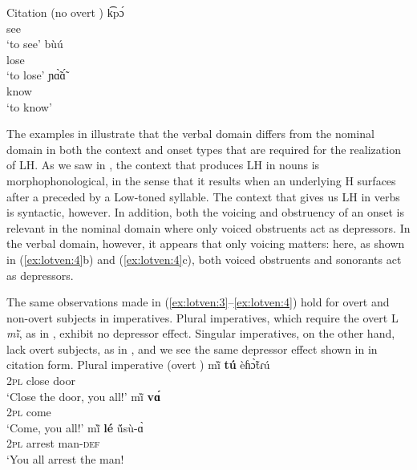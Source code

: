 \documentclass[output=paper,newtxmath,modfonts,nonflat]{langsci/langscibook}
\begin{document}
\ea\label{ex:lotven:4} Citation (no overt )
\ea\label{ex:lotven:4a}
    \gll k͡pɔ́\\
    see    \\
    \glt ‘to see’
\ex\label{ex:lotven:4b}
	\gll bùú\\
    lose\\
    \glt ‘to lose’
\ex\label{ex:lotven:4c}
	\gll ɲɑ̃̀ɑ̃́\\
    know\\
    \glt ‘to know’
\z
\z
                           
The examples in  illustrate that the verbal domain differs from the nominal domain in both the context and onset types that are required for the realization of LH. As we saw in , the context that produces LH  in nouns is morphophonological, in the sense that it results when an underlying H surfaces after a  preceded by a Low-toned syllable. The context that gives us LH in verbs is syntactic, however. In addition, both the voicing and obstruency of an onset is relevant in the nominal domain where only voiced obstruents act as depressors. In the verbal domain, however, it appears that only voicing matters: here, as shown in (\ref{ex:lotven:4}b) and (\ref{ex:lotven:4}c), both voiced obstruents and sonorants act as depressors.

The same observations made in (\ref{ex:lotven:3}–\ref{ex:lotven:4}) hold for overt and non-overt subjects in imperatives. Plural imperatives, which require the overt L   \textit{mĩ̀}, as in , exhibit no depressor effect. Singular imperatives, on the other hand, lack overt subjects, as in , and we see the same depressor effect shown in  in citation form. 
\ea\label{ex:lotven:5} Plural imperative (overt )
\ea\label{ex:lotven:5a}
    \gll mĩ̀ \textbf{tú} èɦɔ̃̀tɾú\\
    2\textsc{pl}  close door    \\
    \glt ‘Close the door, you all!’
\ex\label{ex:lotven:5b}
	\gll mĩ̀ \textbf{vɑ́} \\
    2\textsc{pl} come\\
    \glt ‘Come, you all!’
\ex\label{ex:lotven:5c}
	\gll mĩ̀ \textbf{lé} ṹsù-ɑ̀ \\
    2\textsc{pl}  arrest man-\textsc{def}\\
    \glt ‘You all arrest the man!
\z
\z
 
\end{document}
